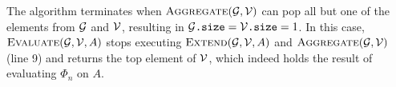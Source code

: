 The algorithm terminates when $\textsc{Aggregate}(\mathcal{G},\mathcal{V})$ can pop all but one of the elements from $\mathcal{G}$ and $\mathcal{V}$, resulting in $\mathcal{G}\texttt{.size} = \mathcal{V}\texttt{.size}=1$. In this case,  $\textsc{Evaluate}(\mathcal{G},\mathcal{V},A)$ stops executing $\textsc{Extend}(\mathcal{G},\mathcal{V},A)$ and $\textsc{Aggregate}(\mathcal{G},\mathcal{V})$ (line 9) and returns the top element of $\mathcal{V}$,
 which indeed holds the result of evaluating $\Phi_n$ on $A$.
 
%
%
%
%
%
%
%
